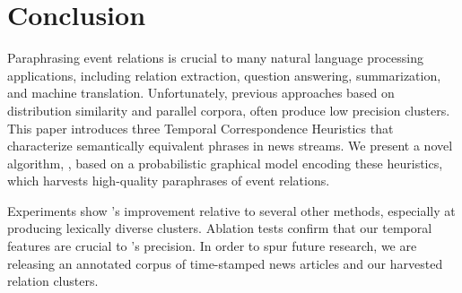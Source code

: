 \section{Conclusion}

Paraphrasing event relations is crucial to many natural language processing
applications, including relation extraction, question answering,
summarization, and machine translation. Unfortunately, previous
approaches based on distribution similarity and parallel corpora,
often produce low precision clusters. This paper introduces three
Temporal Correspondence Heuristics that characterize semantically
equivalent phrases in news streams. We present a novel algorithm,
\sys, based on a probabilistic graphical model encoding these
heuristics, which harvests high-quality paraphrases of event relations.




Experiments show \sys's improvement relative to several other methods,
especially at producing lexically diverse clusters.  Ablation tests
confirm that our temporal features are crucial to \sys's precision. In
order to spur future research, we are releasing an annotated corpus of
time-stamped news articles and our harvested relation clusters.












